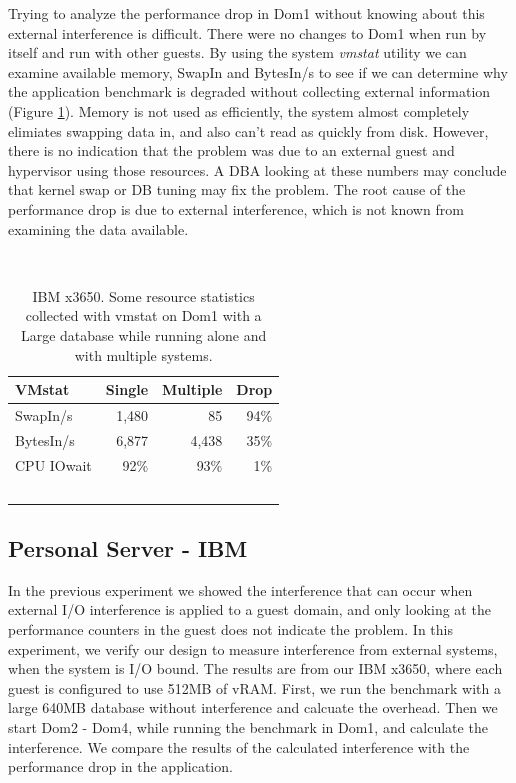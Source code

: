 Trying to analyze the performance drop in Dom1 without knowing about this external interference is difficult.  There were no changes to Dom1 when run by itself and run with other guests.  By using the system \emph{vmstat} utility we can examine available memory, SwapIn and BytesIn/s to see if we can determine why the application benchmark is degraded without collecting external information (Figure \ref{fig:vmstat}).  Memory is not used as efficiently, the system almost completely elimiates swapping data in, and also can't read as quickly from disk.  However, there is no indication that the problem was due to an external guest and hypervisor using those resources.  A DBA looking at these numbers may conclude that kernel swap or DB tuning may fix the problem.  
The root cause of the performance drop is due to external interference, which is not known from examining the data available.

\begin{table}[h]
  \begin{tabular}{ l | r | r | r }
    VMstat & Single & Multiple & Drop \\ \hline
	SwapIn/s & 1,480 & 85 & 94\% \\
	BytesIn/s & 6,877 & 4,438 & 35\% \\
	CPU IOwait & 92\% & 93\% & 1\% \\
  \end{tabular}
\caption{IBM x3650.  Some resource statistics collected with vmstat on Dom1 with a Large database while running alone and with multiple systems.} 
\label{fig:vmstat}
\end{table}

\subsection{Personal Server - IBM}
In the previous experiment we showed the interference that can occur when external I/O interference is applied to a guest domain, and only looking at the performance counters in the guest does not indicate the problem.  In this experiment, we verify our design to measure interference from external systems, when the system is I/O bound.  The results are from our IBM x3650, where each guest is configured to use 512MB of vRAM.  First, we run the benchmark with a large 640MB database without interference and calcuate the overhead.  Then we start Dom2 - Dom4, while running the benchmark in Dom1, and calculate the interference.  We compare the results of the calculated interference with the performance drop in the application.

